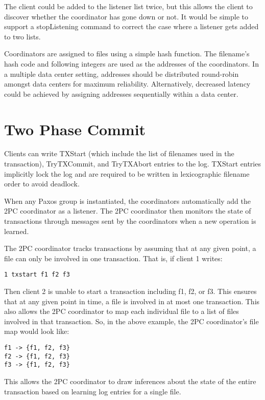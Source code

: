 \documentclass[11pt]{article}
\begin{document}
The client could be added to the listener list twice, but this allows the client to discover whether the coordinator has gone down or not.
It would be simple to support a stopListening command to correct the case where a listener gets added to two lists.

Coordinators are assigned to files using a simple hash function.
The filename's hash code and following integers are used as the addresses of the coordinators.
In a multiple data center setting, addresses should be distributed round-robin amongst data centers for maximum reliability.
Alternatively, decreased latency could be achieved by assigning addresses sequentially within a data center.

\section{Two Phase Commit}

Clients can write TXStart (which include the list of filenames used in the transaction), TryTXCommit, and TryTXAbort entries to the log.
TXStart entries implicitly lock the log and are required to be written in lexicographic filename order to avoid deadlock.

When any Paxos group is instantiated, the coordinators automatically add the 2PC coordinator as a listener.
The 2PC coordinator then monitors the state of transactions through messages sent by the coordinators when a new operation is learned.

The 2PC coordinator tracks transactions by assuming that at any given point, a file can only be involved in one transaction.
That is, if client 1 writes:
\begin{verbatim}
1 txstart f1 f2 f3
\end{verbatim}

Then client 2 is unable to start a transaction including f1, f2, or f3.
This ensures that at any given point in time, a file is involved in at most one transaction.
This also allows the 2PC coordinator to map each individual file to a list of files involved in that transaction.
So, in the above example, the 2PC coordinator's file map would look like:

\begin{verbatim}
f1 -> {f1, f2, f3}
f2 -> {f1, f2, f3}
f3 -> {f1, f2, f3}
\end{verbatim}

This allows the 2PC coordinator to draw inferences about the state of the entire transaction based on learning log entries for a single file.
\end{document}
